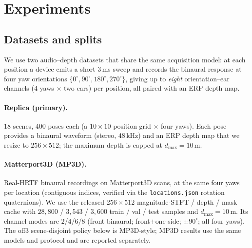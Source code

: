 \newcommand{\tbd}{\textcolor{red}{TBD}}

\section{Experiments}
\label{sec:experiments}

\subsection{Datasets and splits}
\label{sec:dataset}
We use two audio--depth datasets that share the same acquisition model: at each
position a device emits a short $3$\,ms sweep and records the binaural response at
four yaw orientations $\{0^\circ,90^\circ,180^\circ,270^\circ\}$, giving up to
\emph{eight} orientation--ear channels ($4$ yaws $\times$ two ears) per position, all
paired with an ERP depth map.

\paragraph{Replica (primary).}
$18$ scenes, $400$ poses each (a $10\times10$ position grid $\times$ four yaws).
Each pose provides a binaural waveform (stereo, $48$\,kHz) and an ERP depth map that
we resize to $256\times512$; the maximum depth is capped at $d_{\max}=10$\,m.

\paragraph{Matterport3D (MP3D).}
Real-HRTF binaural recordings on Matterport3D scans, at the same four yaws per
location (contiguous indices, verified via the \texttt{locations.json} rotation
quaternions). We use the released $256\times512$ magnitude-STFT / depth / mask cache
with $28{,}800$ / $3{,}543$ / $3{,}600$ train / val / test samples and $d_{\max}=10$\,m.
Its channel modes are $2$/$4$/$6$/$8$ (front binaural; front$+$one side; $\pm90^\circ$;
all four yaws). The off3 scene-disjoint policy below is MP3D-style; MP3D results use
the same models and protocol and are reported separately.

